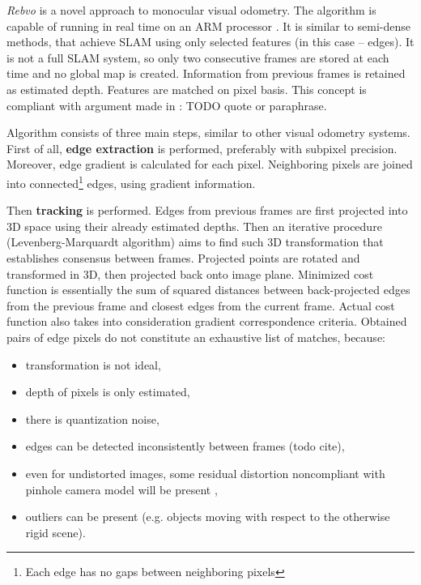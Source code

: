 \textit{Rebvo} is a novel approach to monocular visual odometry. The algorithm is capable of running in real time on an ARM processor \cite{jose2015realtime}. It is similar to semi-dense methods, that achieve SLAM using only selected features (in this case -- edges). It is not a full SLAM system, so only two consecutive frames are stored at each time and no global map is created. Information from previous frames is retained as estimated depth. Features are matched on pixel basis. This concept is compliant with argument made in \cite{harris}: TODO quote or paraphrase.

Algorithm consists of three main steps, similar to other visual odometry systems. First of all, \textbf{edge extraction} is performed, preferably with subpixel precision. Moreover, edge gradient is calculated for each pixel. Neighboring pixels are joined into connected\footnote{Each edge has no gaps between neighboring pixels} edges, using gradient information.

Then \textbf{tracking} is performed. Edges from previous frames are first projected into 3D space using their already estimated depths. Then an iterative procedure (Levenberg-Marquardt algorithm) aims to find such 3D transformation that establishes consensus between frames. Projected points are rotated and transformed in 3D, then projected back onto image plane. Minimized cost function is essentially the sum of squared distances between back-projected edges from the previous frame and closest edges from the current frame. Actual cost function also takes into consideration gradient correspondence criteria. Obtained pairs of edge pixels do not constitute an exhaustive list of matches, because:
\begin{itemize}
\item transformation is not ideal,
\item depth of pixels is only estimated,
\item there is quantization noise,
\item edges can be detected inconsistently between frames (todo cite),
\item even for undistorted images, some residual distortion noncompliant with pinhole camera model will be present \cite{barreto2007non},
\item outliers can be present (e.g. objects moving with respect to the otherwise rigid scene).
\end{itemize}
 
